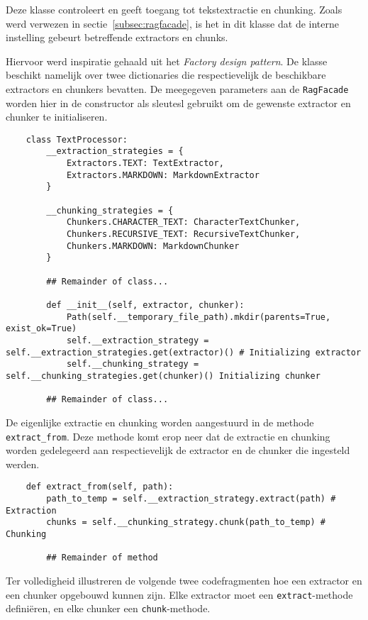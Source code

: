 Deze klasse controleert en geeft toegang tot tekstextractie en chunking. Zoals werd verwezen in sectie~\ref{subsec:ragfacade}, is het in dit klasse dat de interne instelling gebeurt betreffende extractors en chunks.

Hiervoor werd inspiratie gehaald uit het \emph{Factory design pattern}. De klasse beschikt namelijk over twee dictionaries die respectievelijk de beschikbare extractors en chunkers bevatten. De meegegeven parameters aan de \texttt{RagFacade} worden hier in de constructor als sleutesl gebruikt om de gewenste extractor en chunker te initialiseren.

\begin{verbatim}
    class TextProcessor:
        __extraction_strategies = {
            Extractors.TEXT: TextExtractor,
            Extractors.MARKDOWN: MarkdownExtractor
        }
    
        __chunking_strategies = {
            Chunkers.CHARACTER_TEXT: CharacterTextChunker,
            Chunkers.RECURSIVE_TEXT: RecursiveTextChunker,
            Chunkers.MARKDOWN: MarkdownChunker
        }
    
        ## Remainder of class...
    
        def __init__(self, extractor, chunker):
            Path(self.__temporary_file_path).mkdir(parents=True, exist_ok=True)
            self.__extraction_strategy = self.__extraction_strategies.get(extractor)() # Initializing extractor
            self.__chunking_strategy =  self.__chunking_strategies.get(chunker)() Initializing chunker
        
        ## Remainder of class...
\end{verbatim}

De eigenlijke extractie en chunking worden aangestuurd in de methode \texttt{extract\_from}. Deze methode komt erop neer dat de extractie en chunking worden gedelegeerd aan respectievelijk de extractor en de chunker die ingesteld werden.

\begin{verbatim}
    def extract_from(self, path):
        path_to_temp = self.__extraction_strategy.extract(path) # Extraction
        chunks = self.__chunking_strategy.chunk(path_to_temp) # Chunking
        
        ## Remainder of method
\end{verbatim}

Ter volledigheid illustreren de volgende twee codefragmenten hoe een extractor en een chunker opgebouwd kunnen zijn. Elke extractor moet een \texttt{extract}-methode definiëren, en elke chunker een \texttt{chunk}-methode.

